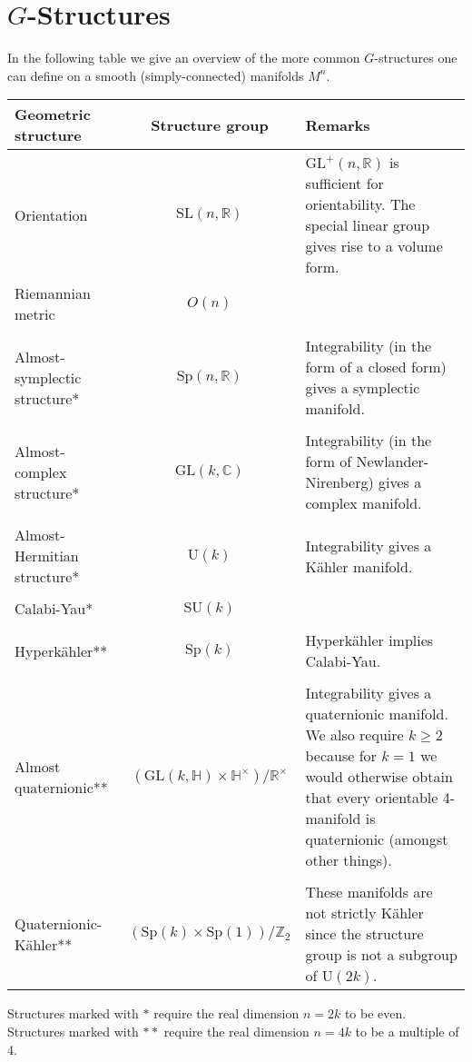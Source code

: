 \chapter{\texorpdfstring{$G$-Structures}{G-Structures}}
    In the following table we give an overview of the more common $G$-structures one can define on a smooth (simply-connected) manifolds $M^n$.
    \begin{center}
        \begin{tabularx}{\textwidth}{|l|c|X|}
             \hline
                 Geometric structure&Structure group&Remarks\\
             \hline
                 Orientation&$\text{SL}(n,\mathbb{R})$&$\text{GL}^+(n, \mathbb{R})$ is sufficient for orientability. The special linear group gives rise to a volume form.\\
                 Riemannian metric&$O(n)$&\\&&\\
                 Almost-symplectic structure*&$\text{Sp}(n,\mathbb{R})$&Integrability (in the form of a closed form) gives a symplectic manifold.\\&&\\
                 Almost-complex structure*&$\text{GL}(k, \mathbb{C})$&Integrability (in the form of Newlander-Nirenberg) gives a complex manifold.\\&&\\
                 Almost-Hermitian structure*&$\text{U}(k)$&Integrability gives a K\"ahler manifold.\\&&\\
                 Calabi-Yau*&$\text{SU}(k)$&\\&&\\
                 Hyperk\"ahler**&$\text{Sp}(k)$&Hyperk\"ahler implies Calabi-Yau.\\&&\\
                 Almost quaternionic**&$(\text{GL}(k,\mathbb{H})\times\mathbb{H}^\times)/\mathbb{R}^\times$&Integrability gives a quaternionic manifold. We also require $k\geq2$ because for $k=1$ we would otherwise obtain that every orientable 4-manifold is quaternionic (amongst other things).\\&&\\
                 Quaternionic-K\"ahler**&$(\text{Sp}(k)\times\text{Sp}(1))/\mathbb{Z}_2$&These manifolds are not strictly K\"ahler since the structure group is not a subgroup of $\text{U}(2k)$.\\
             \hline
        \end{tabularx}
    \end{center}
    Structures marked with $\ast$ require the real dimension $n=2k$ to be even. Structures marked with $\ast\ast$ require the real dimension $n=4k$ to be a multiple of 4.

